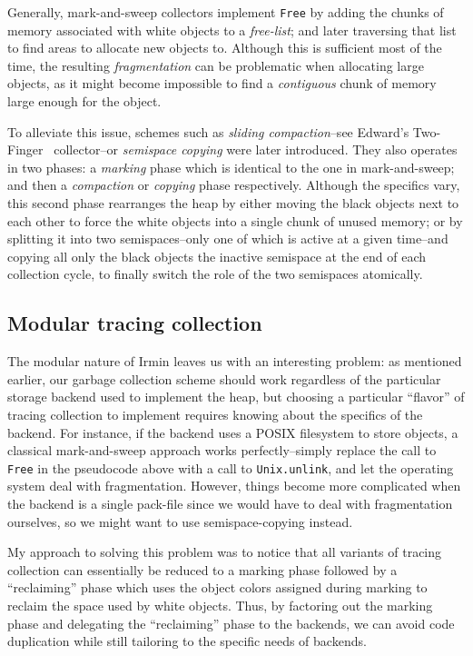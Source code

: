 Generally, mark-and-sweep collectors implement \texttt{Free} by adding the chunks of memory associated with white objects to a \emph{free-list}; and later traversing that list to find areas to allocate new objects to. Although this is sufficient most of the time, the resulting \emph{fragmentation} can be problematic when allocating large objects, as it might become impossible to find a \emph{contiguous} chunk of memory large enough for the object.

To alleviate this issue, schemes such as \emph{sliding compaction}--see Edward's Two-Finger~\cite{saunders74} collector--or \emph{semispace copying} were later introduced. They also operates in two phases: a \emph{marking} phase which is identical to the one in mark-and-sweep; and then a \emph{compaction} or \emph{copying} phase respectively. Although the specifics vary, this second phase rearranges the heap by either moving the black objects next to each other to force the white objects into a single chunk of unused memory; or by splitting it into two semispaces--only one of which is active at a given time--and copying all only the black objects the inactive semispace at the end of each collection cycle, to finally switch the role of the two semispaces atomically.

\subsection{Modular tracing collection}

The modular nature of Irmin leaves us with an interesting problem: as mentioned earlier, our garbage collection scheme should work regardless of the particular storage backend used to implement the heap, but choosing a particular ``flavor'' of tracing collection to implement requires knowing about the specifics of the backend. For instance, if the backend uses a POSIX filesystem to store objects, a classical mark-and-sweep approach works perfectly--simply replace the call to \texttt{Free} in the pseudocode above with a call to \texttt{Unix.unlink}, and let the operating system deal with fragmentation. However, things become more complicated when the backend is a single pack-file since we would have to deal with fragmentation ourselves, so we might want to use semispace-copying instead.

My approach to solving this problem was to notice that all variants of tracing collection can essentially be reduced to a marking phase followed by a ``reclaiming'' phase which uses the object colors assigned during marking to reclaim the space used by white objects. Thus, by factoring out the marking phase and delegating the ``reclaiming'' phase to the backends, we can avoid code duplication while still tailoring to the specific needs of backends.

